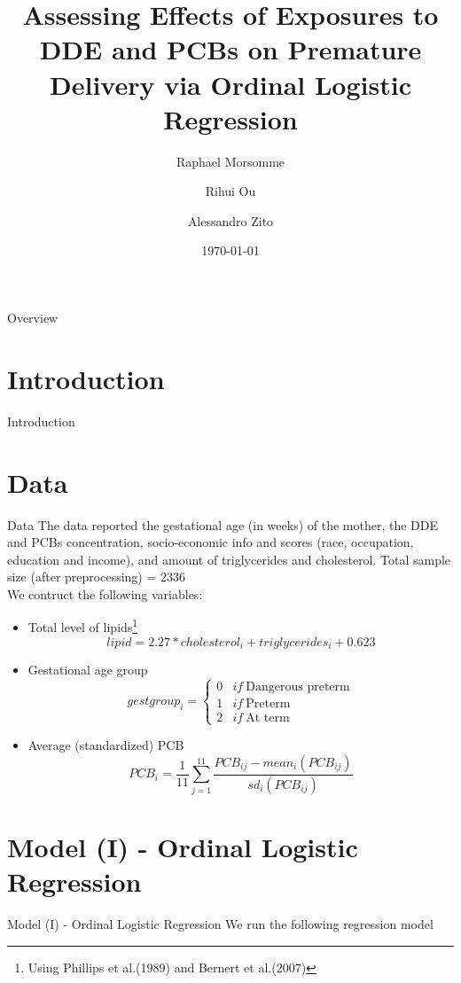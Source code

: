 \documentclass{beamer}
\title[DDE and PCB effect on Premature delivery]{Assessing Effects of Exposures to DDE and PCBs on Premature Delivery via Ordinal Logistic Regression}
\author[Morsomme, Ou, Zito]{Raphael Morsomme \and Rihui Ou \and Alessandro Zito}
\institute[Stat 723]{Case Study 1- Stat 723}
\date{\today}
\begin{document}
\begin{frame}
\titlepage
\end{frame}

\begin{frame}{Overview}
\tableofcontents
\end{frame}

\section{Introduction}
\begin{frame}{Introduction}
\end{frame}
\section{Data}
\begin{frame}{Data}
{\small The data reported the gestational age (in weeks) of the mother, the DDE and PCBs concentration, socio-economic info and scores (race, occupation, education and income), and amount of triglycerides and cholesterol. Total sample size (after preprocessing) = 2336}\\
\smallskip
We contruct the following variables:
\begin{itemize}
\item Total level of lipids\footnote{Using Phillips et al.(1989) and Bernert et al.(2007)} $$lipid =  2.27 * cholesterol_i + triglycerides_i + 0.623$$ 
\item Gestational age group $$gestgroup_i = 
\begin{cases}
0 & if \ \textrm{Dangerous preterm} \\
1 & if \ \textrm{Preterm} \\
2 & if \ \textrm{At term} 
\end{cases}$$
\item Average (standardized) PCB $$PCB_i = \frac{1}{11}\sum_{j=1}^11 \frac{PCB_{ij} - mean_i(PCB_{ij})}{sd_i(PCB_{ij})}$$
\end{itemize}
\end{frame}


\section{Model (I) - Ordinal Logistic Regression}
\begin{frame}{Model (I) - Ordinal Logistic Regression}
We run the following regression model

\end{frame}
\end{document}
